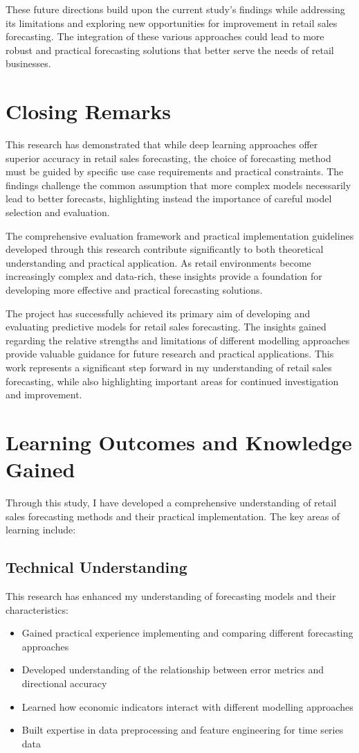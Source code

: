 \documentclass[12pt,a4paper]{report}
\begin{document}
These future directions build upon the current study's findings while addressing its limitations and exploring new opportunities for improvement in retail sales forecasting. The integration of these various approaches could lead to more robust and practical forecasting solutions that better serve the needs of retail businesses.

\section{Closing Remarks}
This research has demonstrated that while deep learning approaches offer superior accuracy in retail sales forecasting, the choice of forecasting method must be guided by specific use case requirements and practical constraints. The findings challenge the common assumption that more complex models necessarily lead to better forecasts, highlighting instead the importance of careful model selection and evaluation.

The comprehensive evaluation framework and practical implementation guidelines developed through this research contribute significantly to both theoretical understanding and practical application. As retail environments become increasingly complex and data-rich, these insights provide a foundation for developing more effective and practical forecasting solutions.

The project has successfully achieved its primary aim of developing and evaluating predictive models for retail sales forecasting. The insights gained regarding the relative strengths and limitations of different modelling approaches provide valuable guidance for future research and practical applications. This work represents a significant step forward in my understanding of retail sales forecasting, while also highlighting important areas for continued investigation and improvement.

\section{Learning Outcomes and Knowledge Gained}

Through this study, I have developed a comprehensive understanding of retail sales forecasting methods and their practical implementation. The key areas of learning include:

\subsection{Technical Understanding}
This research has enhanced my understanding of forecasting models and their characteristics:
\begin{itemize}
    \item Gained practical experience implementing and comparing different forecasting approaches
    \item Developed understanding of the relationship between error metrics and directional accuracy
    \item Learned how economic indicators interact with different modelling approaches
    \item Built expertise in data preprocessing and feature engineering for time series data
\end{itemize}
\end{document}
